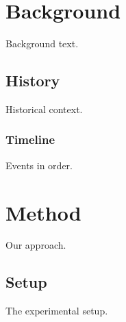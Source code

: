 \documentclass{report}
\begin{document}
\chapter{Background}
Background text.
\section{History}
Historical context.
\subsection{Timeline}
Events in order.
\chapter{Method}
Our approach.
\section{Setup}
The experimental setup.
\end{document}
